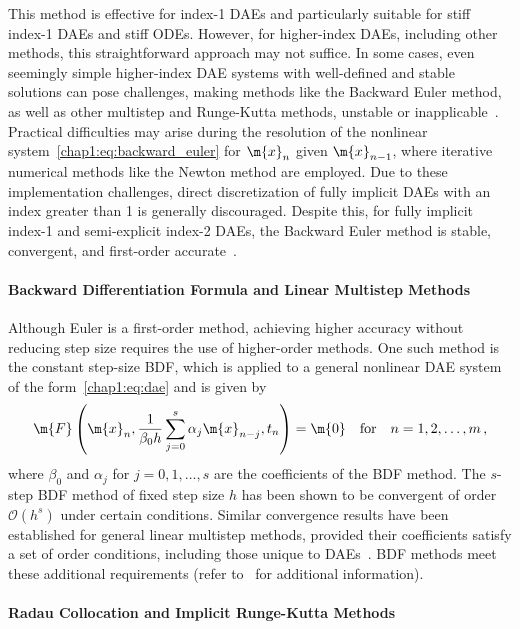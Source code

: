 This method is effective for index-1 \acp{DAE} and particularly suitable for stiff index-1 \acp{DAE} and stiff \acp{ODE}. However, for higher-index \acp{DAE}, including other methods, this straightforward approach may not suffice. In some cases, even seemingly simple higher-index \ac{DAE} systems with well-defined and stable solutions can pose challenges, making methods like the Backward Euler method, as well as other multistep and Runge-Kutta methods, unstable or inapplicable~\cite{ascher1998computer}. Practical difficulties may arise during the resolution of the nonlinear system~\eqref{chap1:eq:backward_euler} for $\m{x}_n$ given $\m{x}_{n-1}$, where iterative numerical methods like the Newton method are employed. Due to these implementation challenges, direct discretization of fully implicit \acp{DAE} with an index greater than 1 is generally discouraged. Despite this, for fully implicit index-1 and semi-explicit index-2 \acp{DAE}, the Backward Euler method is stable, convergent, and first-order accurate~\cite{brenan1995numerical, hairer1999stiff}.

\paragraph{Backward Differentiation Formula and Linear Multistep Methods}

Although Euler is a first-order method, achieving higher accuracy without reducing step size requires the use of higher-order methods. One such method is the constant step-size \ac{BDF}, which is applied to a general nonlinear \ac{DAE} system of the form~\eqref{chap1:eq:dae} and is given by
%
\begin{equation*}
  \m{F}\left(\m{x}_n, \dfrac{1}{\beta_0 h} \sum_{j=0}^{s} \alpha_j \m{x}_{n-j}, t_n\right) = \m{0} \quad \text{for} \quad n = 1, 2, \dots, m \, \text{,}
\end{equation*}
%
where $\beta_0$ and $\alpha_j$ for $j = 0, 1, \dots, s$ are the coefficients of the \ac{BDF} method. The $s$-step \ac{BDF} method of fixed step size $h$ has been shown to be convergent of order $\mathcal{O}(h^s)$ under certain conditions. Similar convergence results have been established for general linear multistep methods, provided their coefficients satisfy a set of order conditions, including those unique to \acp{DAE}~\cite{brenan1995numerical}. \ac{BDF} methods meet these additional requirements (refer to~\cite{brenan1995numerical} for additional information).

\paragraph{Radau Collocation and Implicit Runge-Kutta Methods}

